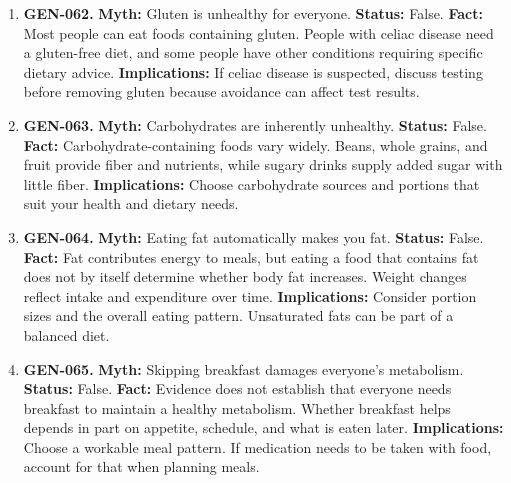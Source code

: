 \documentclass[11pt,oneside]{book}
\begin{document}
\begin{enumerate}[leftmargin=0pt,labelwidth=0pt,labelsep=0pt,itemindent=0pt]
\textbf{Implications:} Choose juice as a food if you enjoy it. A juice-only regimen can displace foods that supply protein and fiber.
\item[] \textbf{GEN-062.} \textbf{Myth:} Gluten is unhealthy for everyone.\newline
\textbf{Status:} False.\newline
\textbf{Fact:} Most people can eat foods containing gluten. People with celiac disease need a gluten-free diet, and some people have other conditions requiring specific dietary advice. \cite{ref194}\newline
\textbf{Implications:} If celiac disease is suspected, discuss testing before removing gluten because avoidance can affect test results.
\item[] \textbf{GEN-063.} \textbf{Myth:} Carbohydrates are inherently unhealthy.\newline
\textbf{Status:} False.\newline
\textbf{Fact:} Carbohydrate-containing foods vary widely. Beans, whole grains, and fruit provide fiber and nutrients, while sugary drinks supply added sugar with little fiber. \cite{ref191}\newline
\textbf{Implications:} Choose carbohydrate sources and portions that suit your health and dietary needs.
\item[] \textbf{GEN-064.} \textbf{Myth:} Eating fat automatically makes you fat.\newline
\textbf{Status:} False.\newline
\textbf{Fact:} Fat contributes energy to meals, but eating a food that contains fat does not by itself determine whether body fat increases. Weight changes reflect intake and expenditure over time. \cite{ref191}\newline
\textbf{Implications:} Consider portion sizes and the overall eating pattern. Unsaturated fats can be part of a balanced diet.
\item[] \textbf{GEN-065.} \textbf{Myth:} Skipping breakfast damages everyone's metabolism.\newline
\textbf{Status:} False.\newline
\textbf{Fact:} Evidence does not establish that everyone needs breakfast to maintain a healthy metabolism. Whether breakfast helps depends in part on appetite, schedule, and what is eaten later. \cite{ref191}\newline
\textbf{Implications:} Choose a workable meal pattern. If medication needs to be taken with food, account for that when planning meals.

\end{enumerate}
\end{document}
